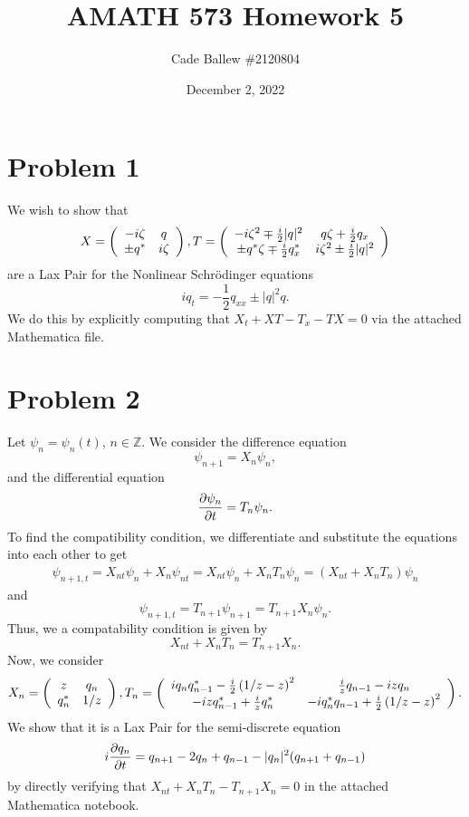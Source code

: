 \documentclass{article}
\title{AMATH 573 Homework 5}
\author{Cade Ballew \#2120804}
\date{December 2, 2022}
\begin{document}
	
\maketitle
	
\section{Problem 1}
We wish to show that
$$
X=\left(\ba{cc}-i\zeta&q\\\pm q^*&i\zeta\ea\right),
T=\left(\ba{cc}-i\zeta^2\mp\frac{i}{2}|q|^2&q\zeta+\frac{i}{2}q_x\\
\pm q^*\zeta\mp \frac{i}{2}q^*_x&i\zeta^2\pm\frac{i}{2}|q|^2\ea\right)
$$
are a Lax Pair for the Nonlinear Schr\"odinger equations
$$
iq_t=-\frac{1}{2}q_{xx}\pm |q|^2 q.
$$
We do this by explicitly computing that $X_t+XT-T_x-TX=0$ via the attached Mathematica file.

\section{Problem 2}
Let $\psi_n=\psi_n(t)$, $n\in \mathbb{Z}$.
We consider the difference equation
$$
\psi_{n+1}=X_n \psi_n,
$$
and the differential equation
$$
\pp{\psi_n}{t}=T_n\psi_n.
$$
To find the compatibility condition, we differentiate and substitute the equations into each other to get 
\begin{align*}
\psi_{n+1,t}=X_{nt}\psi_n+X_n\psi_{nt}=X_{nt}\psi_n+X_nT_n\psi_n=(X_{nt}+X_nT_n)\psi_n
\end{align*}
and 
\[
\psi_{n+1,t}=T_{n+1}\psi_{n+1}=T_{n+1}X_n\psi_n.
\]
Thus, we a compatability condition is given by
\[
X_{nt}+X_nT_n=T_{n+1}X_n.
\]
Now, we consider $$
X_n=\left(\ba{cc}z&q_n\\q^*_n&1/z\ea\right),
T_n=\left(\ba{cc}
i q_n q^*_{n-1}-\frac{i}{2}\left(1/z-z\right)^2&
\frac{i}{z}q_{n-1}-izq_n\\
-izq^*_{n-1}+\frac{i}{z}q^*_n&
-i q^*_n q_{n-1}+\frac{i}{2}\left(1/z-z\right)^2
\ea\right).
$$
We show that it is a Lax Pair for the semi-discrete equation
$$
i \pp{q_n}{t}=q_{n+1}-2q_n+q_{n-1}-|q_n|^2 (q_{n+1}+q_{n-1})
$$
by directly verifying that $X_{nt}+X_nT_n-T_{n+1}X_n=0$ in the attached Mathematica notebook.
\end{document}

